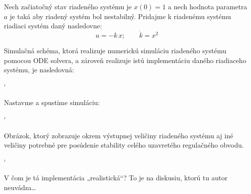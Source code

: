 \documentclass[a4paper, 10pt, ]{article}
\begin{document}
Nech začiatočný stav riadeného systému je $x(0) = 1$ a nech hodnota parametra $a$ je taká aby riadený systém bol nestabilný. Pridajme k riadenému systému riadiaci systém daný nasledovne:
\begin{equation}
	u = -k\, x; \qquad \dot{k} = x^2
\end{equation}


Simulačná schéma, ktorá realizuje numerickú simuláciu riadeného systému pomocou ODE solvera, a zároveň realizuje istú implementáciu daného riadiaceho systému, je nasledovná:


{\catcode`

}

\noindent
Nastavme a spustime simuláciu:

{\catcode`

}


\noindent
Obrázok, ktorý zobrazuje okrem výstupnej veličiny riadeného systému aj iné veličiny potrebné pre posúdenie stability celého uzavretého regulačného obvodu.

{\catcode`

}


\begin{centering}


    \vspace{-2mm}

    \figcaption{}

    \vspace{2mm}

    \label{figsc_ar02_f03_f01_0}

\end{centering}

\noindent
V čom je tá implementácia „realistická“? To je na diskusiu, ktorú tu autor neuvádza\ldots
\end{document}
